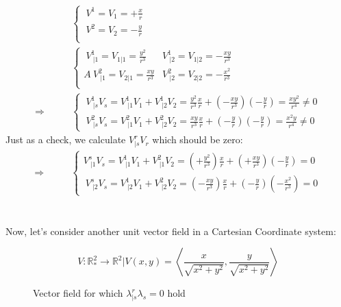 \begin{align}
\ & \left \{ \begin{array}{c}
\ V^1 = V_1 = +\frac{x}{r}\\
\ V^2 = V_2 = -\frac{y}{r}\\
\end{array}\right.\\
\ & \left \{ \begin{array}{cc}
\ V^1_{\ |1} =  V_{1|1} = \frac{y^2}{r^3}&V^1_{\ |2} =  V_{1|2} = -\frac{xy}{r^3}\\A
\ V^2_{\ |1} =  V_{2|1} = \frac{xy}{r^3}&V^2_{\ |2} =  V_{2|2} = -\frac{x^2}{r^3}\\
\end{array}\right.\\
\Rightarrow \quad\quad &\left \{ \begin{array}{c} \  V^1_{\ |s}V_s = V^1_{\ |1}V_1+V^1_{\ |2}V_2 = \frac{y^2}{r^3}\frac{x}{r}+ (-\frac{xy}{r^3})(-\frac{y}{r}) = \frac{xy^2}{r^4} \ne 0\\
\ V^2_{\ |s}V_s = V^2_{\ |1}V_1+V^2_{\ |2}V_2 = \frac{xy}{r^3}\frac{x}{r}+ (-\frac{y}{r})(-\frac{y}{r}) = \frac{x^2 y}{r^4} \ne 0
\end{array} \right.
\end{align}
Just as a check, we calculate $V^r_{|s}V_r$ which should be zero:
\begin{align}
\Rightarrow \quad\quad &\left \{ \begin{array}{c}V^s_{\ |1}V_s = V^1_{\ |1}V_1+V^2_{\ |1}V_2 = (+\frac{y^2}{r^3})\frac{x}{r}+ (+\frac{xy}{r^3})(-\frac{y}{r}) =0\\
\ V^s_{\ |2}V_s = V^1_{\ |2}V_1+V^2_{\ |2}V_2 = (-\frac{xy}{r^3})\frac{x}{r}+ (-\frac{y}{r})(-\frac{x^2}{r^3}) = 0
\end{array} \right.
\end{align}\\\\
Now, let's consider another unit vector field in a Cartesian Coordinate system:
\begin{figure}[H]

\centering
\begin{minipage}[H]{.4\textwidth}
\vspace{0pt}

\end{minipage}\hfill
\begin{minipage}[H]{0.4\textwidth}
\vspace{50pt}
$$V:\mathbb{R}_*^2\rightarrow \mathbb{R}^2|V(x,y) = \left< \frac{x}{\sqrt{x^2+y^2}},\frac{y}{\sqrt{x^2+y^2}} \right>$$
\end{minipage}
\caption{Vector field for which $\lambda^r_{|s}\lambda_s = 0$ hold}
\end{figure}
